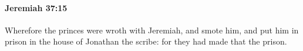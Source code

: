 
		\paragraph{Jeremiah 37:15} %
			\label{JEREMIAH-37-15}

			Wherefore the princes were wroth with Jeremiah, and smote him, and put him in prison in the house of Jonathan the scribe: for they had made that the prison.


